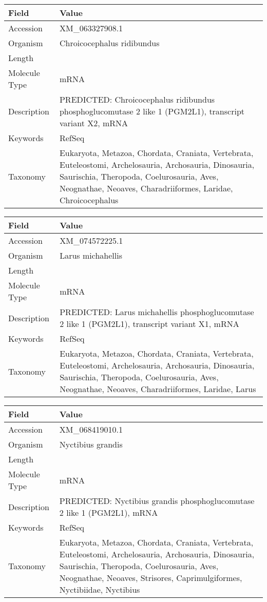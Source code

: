 \documentclass[10pt]{article}
\begin{document}
{\footnotesize
\begin{longtable}{>{\raggedright\arraybackslash}p{4.5cm} >{\raggedright\arraybackslash}p{11.5cm}}
\textbf{Field} & \textbf{Value} \\
\hline
Accession & XM\_063327908.1 \\
Organism & Chroicocephalus ridibundus \\
Length & 6494 \\
Molecule Type & mRNA \\
Description & PREDICTED: Chroicocephalus ridibundus phosphoglucomutase 2 like 1 (PGM2L1), transcript variant X2, mRNA \\
Keywords & RefSeq \\
Taxonomy & Eukaryota, Metazoa, Chordata, Craniata, Vertebrata, Euteleostomi, Archelosauria, Archosauria, Dinosauria, Saurischia, Theropoda, Coelurosauria, Aves, Neognathae, Neoaves, Charadriiformes, Laridae, Chroicocephalus \\
\end{longtable}
}

{\footnotesize
\begin{longtable}{>{\raggedright\arraybackslash}p{4.5cm} >{\raggedright\arraybackslash}p{11.5cm}}
\textbf{Field} & \textbf{Value} \\
\hline
Accession & XM\_074572225.1 \\
Organism & Larus michahellis \\
Length & 6568 \\
Molecule Type & mRNA \\
Description & PREDICTED: Larus michahellis phosphoglucomutase 2 like 1 (PGM2L1), transcript variant X1, mRNA \\
Keywords & RefSeq \\
Taxonomy & Eukaryota, Metazoa, Chordata, Craniata, Vertebrata, Euteleostomi, Archelosauria, Archosauria, Dinosauria, Saurischia, Theropoda, Coelurosauria, Aves, Neognathae, Neoaves, Charadriiformes, Laridae, Larus \\
\end{longtable}
}

{\footnotesize
\begin{longtable}{>{\raggedright\arraybackslash}p{4.5cm} >{\raggedright\arraybackslash}p{11.5cm}}
\textbf{Field} & \textbf{Value} \\
\hline
Accession & XM\_068419010.1 \\
Organism & Nyctibius grandis \\
Length & 6374 \\
Molecule Type & mRNA \\
Description & PREDICTED: Nyctibius grandis phosphoglucomutase 2 like 1 (PGM2L1), mRNA \\
Keywords & RefSeq \\
Taxonomy & Eukaryota, Metazoa, Chordata, Craniata, Vertebrata, Euteleostomi, Archelosauria, Archosauria, Dinosauria, Saurischia, Theropoda, Coelurosauria, Aves, Neognathae, Neoaves, Strisores, Caprimulgiformes, Nyctibiidae, Nyctibius \\
\end{longtable}
}
\end{document}
